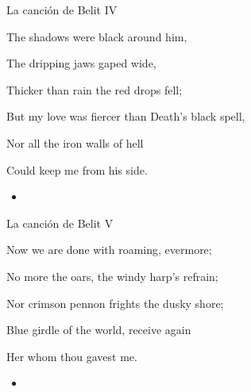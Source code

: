 \begin{frame}{La canción de Belit IV}
	\begin{exampleblock}{}
		The shadows were black around him,

		The dripping jaws gaped wide,

		Thicker than rain the red drops fell;

		But my love was fiercer than Death’s black spell,

		Nor all the iron walls of hell

		Could keep me from his side.
	\end{exampleblock}

	\begin{itemize}
		\item \textit{  }
	\end{itemize}
\end{frame}
\note[itemize]{
	\item
}

\begin{frame}{La canción de Belit V}
	\begin{exampleblock}{}
		Now we are done with roaming, evermore;

		No more the oars, the windy harp’s refrain;

		Nor crimson pennon frights the dusky shore;

		Blue girdle of the world, receive again

		Her whom thou gavest me.
	\end{exampleblock}

	\begin{itemize}
		\item \textit{  }
	\end{itemize}
\end{frame}
\note[itemize]{
	\item
}

